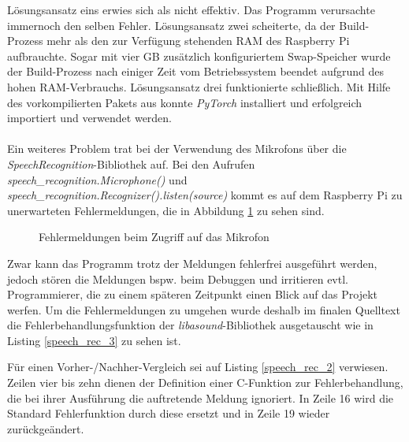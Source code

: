 Lösungsansatz eins erwies sich als nicht effektiv. Das Programm verursachte immernoch den selben Fehler. Lösungsansatz zwei scheiterte, da der Build-Prozess mehr als den zur Verfügung stehenden \ac{RAM} des Raspberry Pi aufbrauchte. Sogar mit vier \ac{GB} zusätzlich konfiguriertem Swap-Speicher wurde der Build-Prozess nach einiger Zeit vom Betriebssystem beendet aufgrund des hohen \ac{RAM}-Verbrauchs. Lösungsansatz drei funktionierte schließlich. Mit Hilfe des vorkompilierten Pakets aus \cite{q-engineering_install_nodate} konnte \textit{PyTorch} installiert und erfolgreich importiert und verwendet werden.\\\\
Ein weiteres Problem trat bei der Verwendung des Mikrofons über die \textit{SpeechRecognition}-Bibliothek auf. Bei den Aufrufen \textit{speech\_recognition.Microphone()} und\\ \textit{speech\_recognition.Recognizer().listen(source)} kommt es auf dem Raspberry Pi zu unerwarteten Fehlermeldungen, die in Abbildung \ref{img:alsa_errors} zu sehen sind.
\begin{figure}[H]
    \centering
    \caption{Fehlermeldungen beim Zugriff auf das Mikrofon}
    \label{img:alsa_errors}
\end{figure}
\noindent
Zwar kann das Programm trotz der Meldungen fehlerfrei ausgeführt werden, jedoch stören die Meldungen bspw. beim Debuggen und irritieren evtl. Programmierer, die zu einem späteren Zeitpunkt einen Blick auf das Projekt werfen. Um die Fehlermeldungen zu umgehen wurde deshalb im finalen Quelltext die Fehlerbehandlungsfunktion der \textit{libasound}-Bibliothek ausgetauscht wie in Listing \ref{speech_rec_3} zu sehen ist.

Für einen Vorher-/Nachher-Vergleich sei auf Listing \ref{speech_rec_2} verwiesen. Zeilen vier bis zehn dienen der Definition einer C-Funktion zur Fehlerbehandlung, die bei ihrer Ausführung die auftretende Meldung ignoriert. In Zeile 16 wird die Standard Fehlerfunktion durch diese ersetzt und in Zeile 19 wieder zurückgeändert. 
